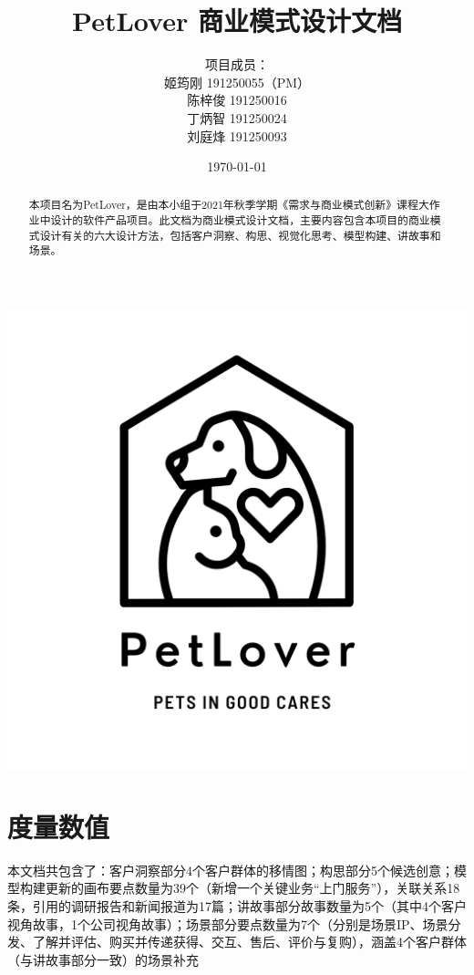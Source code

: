 \documentclass[a4paper]{ctexart}
\title{\Huge PetLover 商业模式设计文档}
\author{
  项目成员：\\
  姬筠刚 191250055（PM）\\
  陈梓俊 191250016\\
  丁炳智 191250024\\
  刘庭烽 191250093\\
}
\date{\today}
\begin{document}
\maketitle

\centerline{\includegraphics[]{logo.png}}

\newpage

\begin{abstract}
  本项目名为PetLover，是由本小组于2021年秋季学期《需求与商业模式创新》课程大作业中设计的软件产品项目。此文档为商业模式设计文档，主要内容包含本项目的商业模式设计有关的六大设计方法，包括客户洞察、构思、视觉化思考、模型构建、讲故事和场景。
\end{abstract}



\tableofcontents

\newpage

\setlength{\parskip}{1em}


\section{度量数值}

本文档共包含了：客户洞察部分4个客户群体的移情图；构思部分5个候选创意；模型构建更新的画布要点数量为39个（新增一个关键业务“上门服务”），关联关系18条，引用的调研报告和新闻报道为17篇；讲故事部分故事数量为5个（其中4个客户视角故事，1个公司视角故事）；场景部分要点数量为7个（分别是场景IP、场景分发、了解并评估、购买并传递获得、交互、售后、评价与复购），涵盖4个客户群体（与讲故事部分一致）的场景补充
\end{document}
